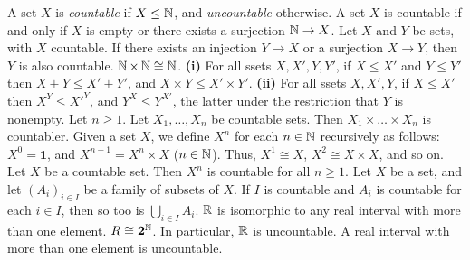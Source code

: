  A set $X$ is \textit{countable} if $X \leq \operatorname{\mathbb{N}}$, and \textit{uncountable} otherwise.
 A set $X$ is countable if and only if $X$ is empty or there exists a surjection $\operatorname{\mathbb{N}} \to X$.
 Let $X$ and $Y$ be sets, with $X$ countable. If there exists an injection $Y \to X$ or a surjection $X \to Y$, then $Y$ is also countable.
 $\operatorname{\mathbb{N}} \times \operatorname{\mathbb{N}} \cong \operatorname{\mathbb{N}}$.
 \textbf{(i)} For all ssets $X, X', Y, Y'$, if $X \leq X'$ and $Y \leq Y'$ then $X + Y \leq X' + Y'$, and $X \times Y \leq X' \times Y'$. \textbf{(ii)} For all ssets $X, X', Y$, if $X \leq X'$ then $X^Y \leq X'^Y$, and $Y^X \leq Y^{X'}$, the latter under the restriction that $Y$ is nonempty.
 Let $n \geq 1$. Let $X_1, \dots, X_n$ be countable sets. Then $X_1 \times \dots \times X_n$ is countabler.
 Given a set $X$, we define $X^n$ for each $n \in \operatorname{\mathbb{N}}$ recursively as follows: $X^0 = \mathbf{1}$, and $X^{n + 1} = X^n \times X$ ($n \in \operatorname{\mathbb{N}}$). Thus, $X^1 \cong X$, $X^2 \cong X \times X$, and so on.
 Let $X$ be a countable set. Then $X^n$ is countable for all $n \geq 1$.
 Let $X$ be a set, and let $(A_i)_{i \in I}$ be a family of subsets of $X$. If $I$ is countable and $A_i$ is countable for each $i \in I$, then so too is $\bigcup_{i \in I} A_i$.
 $\operatorname{\mathbb{R}}$ is isomorphic to any real interval with more than one element.
 $R \cong \mathbf{2}^{\operatorname{\mathbb{N}}}$. In particular, $\operatorname{\mathbb{R}}$ is uncountable.
 A real interval with more than one element is uncountable.
